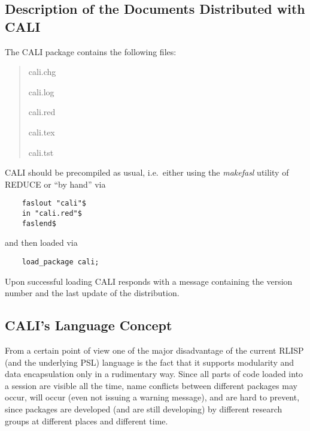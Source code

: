 \subsection{Description of the Documents Distributed with CALI}

The CALI package contains the following files:
\begin{quote}
cali.chg


cali.log


cali.red


cali.tex


cali.tst


\end{quote}

CALI should be precompiled as usual, i.e.\ either using the {\em
makefasl} utility of REDUCE or ``by hand'' via
\begin{verbatim}
    faslout "cali"$
    in "cali.red"$
    faslend$
\end{verbatim}
and then loaded via
\begin{verbatim}
    load_package cali;
\end{verbatim}
Upon successful loading CALI responds with a message containing the
version number and the last update of the distribution.

\begin{center}
\end{center}

\subsection{CALI's Language Concept}

From a certain point of view one of the major disadvantage of the
current RLISP (and the underlying PSL) language is the fact
that it supports modularity and data encapsulation only in a
rudimentary way.  Since all parts of code loaded into a session are
visible all the time, name conflicts between different packages may
occur, will occur (even not issuing a warning message), and are hard
to prevent, since packages are developed (and are still developing)
by different research groups at different places and different time.

